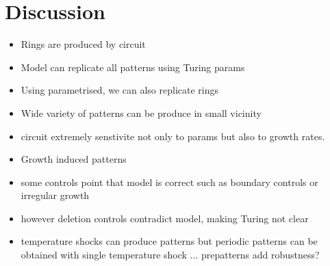 \section{Discussion}
\begin{itemize}
    \item Rings are produced by circuit
    \item Model can replicate all patterns using Turing params
    \item Using parametrised, we can also replicate rings
    \item Wide variety of patterns can be produce in small vicinity
    \item circuit extremely senstivite not only to params but also to growth rates.
    \item Growth induced patterns
    \item some controls point that model is correct such as boundary controls or irregular growth
    \item however deletion controls contradict model, making Turing not clear
    \item temperature shocks can produce patterns but periodic patterns can be obtained with single temperature shock ... prepatterns add robustness?

\end{itemize}


